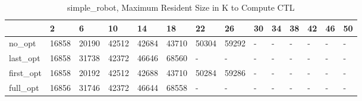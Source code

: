 \begin{table}
\caption{simple_robot, Maximum Resident Size in K to Compute CTL}
\label{simple_robot_CTL_size}
\begin{tabular}{llllllllllllll}
\toprule
 & 2 & 6 & 10 & 14 & 18 & 22 & 26 & 30 & 34 & 38 & 42 & 46 & 50 \\
\midrule
no_opt & 16858 & 20190 & 42512 & 42684 & 43710 & 50304 & 59292 & - & - & - & - & - & - \\
last_opt & 16858 & 31738 & 42372 & 46646 & 68560 & - & - & - & - & - & - & - & - \\
first_opt & 16858 & 20192 & 42512 & 42688 & 43710 & 50284 & 59286 & - & - & - & - & - & - \\
full_opt & 16856 & 31746 & 42372 & 46644 & 68558 & - & - & - & - & - & - & - & - \\
\bottomrule
\end{tabular}
\end{table}
